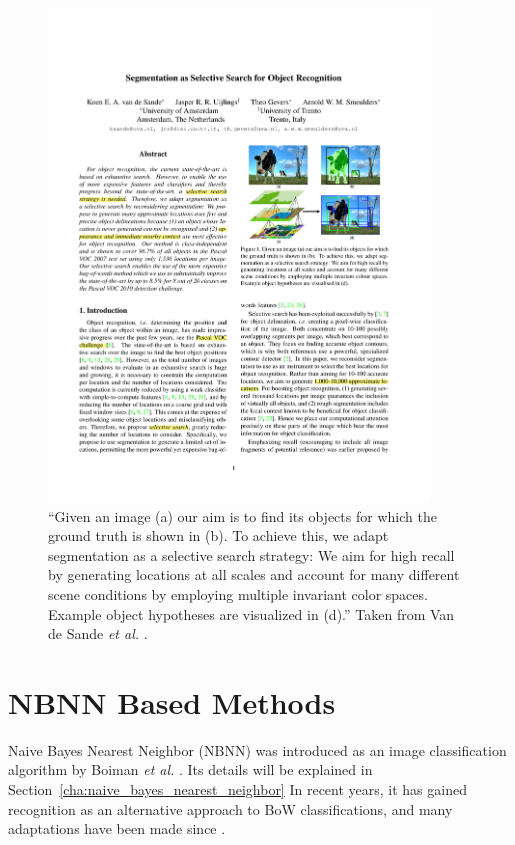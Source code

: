\begin{figure}[hbt]
    \centering
    \includegraphics[width=0.9\textwidth]{LocByDet}
    \caption{``Given an image (a) our aim is to find its objects for which the ground truth is shown in (b). To achieve this, we adapt segmentation as a selective search strategy: We aim for high recall by generating locations at all scales and account for many different scene conditions by employing multiple invariant color spaces. Example object hypotheses are visualized in (d).'' Taken from Van de Sande \emph{et al.} \cite{van2011segmentation}.}
    \label{fig:locbydet}
\end{figure}


\section{NBNN Based Methods} %
\label{sec:nbnn_based_methods}

Naive Bayes Nearest Neighbor (NBNN) was introduced as an image classification algorithm by Boiman \emph{et al.} \cite{boiman2008defense}. Its details will be explained in Section~\ref{cha:naive_bayes_nearest_neighbor} In recent years, it has gained recognition as an alternative approach to BoW classifications, and many adaptations have been made since \cite{becker2012codebook, behmo2010towards, mccann2012local, timofte2012iterative, tuytelaars2011nbnn, wang2011improved}.

